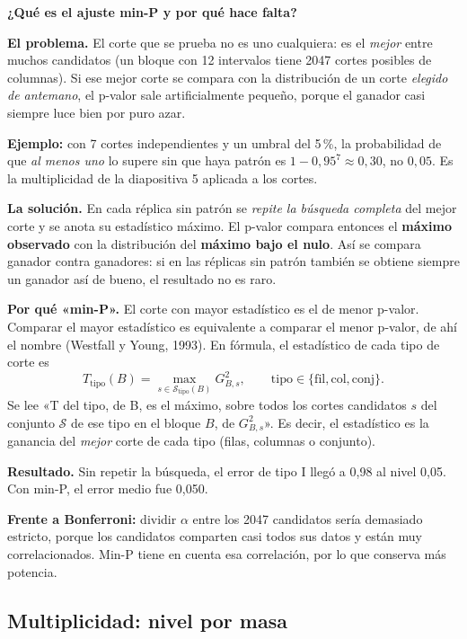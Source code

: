 \documentclass[11pt,a4paper]{article}
\newcommand{\cajainicio}[3]{\par\medskip\noindent
  \begin{lrbox}{\cajabox}\begin{minipage}{\dimexpr\linewidth-2\fboxsep-2\fboxrule\relax}%
  \textbf{\color{#1}#3}\par\smallskip}
\newcommand{\cajafin}[2]{\end{minipage}\end{lrbox}\fcolorbox{#1}{#2}{\usebox{\cajabox}}\par\medskip}
\newenvironment{nota}[1]{\cajainicio{acc}{acc!7}{#1}}{\cajafin{acc}{acc!7}}
\begin{document}
\begin{nota}{¿Qué es el ajuste min-P y por qué hace falta?}
\textbf{El problema.} El corte que se prueba no es uno cualquiera: es el \emph{mejor} entre muchos candidatos (un bloque con 12 intervalos tiene 2047 cortes posibles de columnas). Si ese mejor corte se compara con la distribución de un corte \emph{elegido de antemano}, el p-valor sale artificialmente pequeño, porque el ganador casi siempre luce bien por puro azar.

\textbf{Ejemplo:} con 7 cortes independientes y un umbral del 5\,\%, la probabilidad de que \emph{al menos uno} lo supere sin que haya patrón es $1-0{,}95^{7}\approx 0{,}30$, no $0{,}05$. Es la multiplicidad de la diapositiva 5 aplicada a los cortes.

\textbf{La solución.} En cada réplica sin patrón se \emph{repite la búsqueda completa} del mejor corte y se anota su estadístico máximo. El p-valor compara entonces el \textbf{máximo observado} con la distribución del \textbf{máximo bajo el nulo}. Así se compara ganador contra ganadores: si en las réplicas sin patrón también se obtiene siempre un ganador así de bueno, el resultado no es raro.

\textbf{Por qué «min-P».} El corte con mayor estadístico es el de menor p-valor. Comparar el mayor estadístico es equivalente a comparar el menor p-valor, de ahí el nombre (Westfall y Young, 1993). En fórmula, el estadístico de cada tipo de corte es
\[ T_{\mathrm{tipo}}(B)=\max_{s\in\mathcal{S}_{\mathrm{tipo}}(B)}G^2_{B,s},\qquad \mathrm{tipo}\in\{\mathrm{fil},\mathrm{col},\mathrm{conj}\}. \]
Se lee «T del tipo, de B, es el máximo, sobre todos los cortes candidatos $s$ del conjunto $\mathcal{S}$ de ese tipo en el bloque $B$, de $G^2_{B,s}$». Es decir, el estadístico es la ganancia del \emph{mejor} corte de cada tipo (filas, columnas o conjunto).

\textbf{Resultado.} Sin repetir la búsqueda, el error de tipo I llegó a 0,98 al nivel 0,05. Con min-P, el error medio fue 0,050.

\textbf{Frente a Bonferroni:} dividir $\alpha$ entre los 2047 candidatos sería demasiado estricto, porque los candidatos comparten casi todos sus datos y están muy correlacionados. Min-P tiene en cuenta esa correlación, por lo que conserva más potencia.
\end{nota}

\subsection*{Multiplicidad: nivel por masa}
\end{document}
